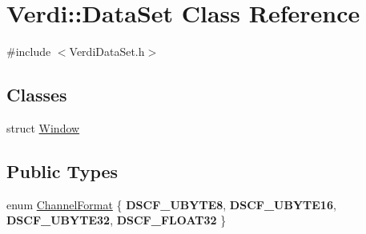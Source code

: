 \hypertarget{class_verdi_1_1_data_set}{\section{\-Verdi\-:\-:\-Data\-Set \-Class \-Reference}
\label{class_verdi_1_1_data_set}
}


{\ttfamily \#include $<$\-Verdi\-Data\-Set.\-h$>$}

\subsection*{\-Classes}
\begin{DoxyCompactItemize}
\item 
struct \hyperlink{struct_verdi_1_1_data_set_1_1_window}{\-Window}
\end{DoxyCompactItemize}
\subsection*{\-Public \-Types}
\begin{DoxyCompactItemize}
\item 
enum \hyperlink{class_verdi_1_1_data_set_abd6d238fa4dff1b0ea6abd391d14ed64}{\-Channel\-Format} \{ {\bfseries \-D\-S\-C\-F\-\_\-\-U\-B\-Y\-T\-E8}, 
{\bfseries \-D\-S\-C\-F\-\_\-\-U\-B\-Y\-T\-E16}, 
{\bfseries \-D\-S\-C\-F\-\_\-\-U\-B\-Y\-T\-E32}, 
{\bfseries \-D\-S\-C\-F\-\_\-\-F\-L\-O\-A\-T32}
 \}
\end{DoxyCompactItemize}
